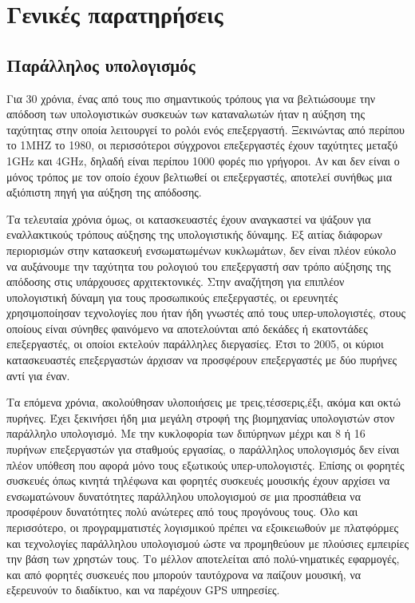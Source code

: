 \chapter{Γενικές παρατηρήσεις}

\section{Παράλληλος υπολογισμός}
Για 30 χρόνια, ένας από τους πιο σημαντικούς τρόπους για να βελτιώσουμε την απόδοση των υπολογιστικών συσκευών των καταναλωτών ήταν η αύξηση της ταχύτητας στην οποία λειτουργεί το ρολόι ενός επεξεργαστή. Ξεκινώντας από περίπου το 1MHZ το 1980, οι περισσότεροι σύγχρονοι επεξεργαστές έχουν ταχύτητες μεταξύ 1GHz και 4GHz, δηλαδή είναι περίπου 1000 φορές πιο γρήγοροι. Αν και δεν είναι ο μόνος τρόπος με τον οποίο έχουν βελτιωθεί οι επεξεργαστές, αποτελεί συνήθως μια αξιόπιστη πηγή για αύξηση της απόδοσης.

Τα τελευταία χρόνια όμως, οι κατασκευαστές έχουν αναγκαστεί να ψάξουν για εναλλακτικούς τρόπους αύξησης της υπολογιστικής δύναμης. Εξ αιτίας διάφορων περιορισμών στην κατασκευή ενσωματωμένων κυκλωμάτων, δεν είναι πλέον εύκολο να αυξάνουμε την ταχύτητα του ρολογιού του επεξεργαστή σαν τρόπο αύξησης της απόδοσης στις υπάρχουσες αρχιτεκτονικές. Στην αναζήτηση για επιπλέον υπολογιστική δύναμη για τους προσωπικούς επεξεργαστές, οι ερευνητές χρησιμοποίησαν τεχνολογίες που ήταν ήδη γνωστές από τους υπερ-υπολογιστές, στους οποίους είναι σύνηθες φαινόμενο να αποτελούνται από δεκάδες ή εκατοντάδες επεξεργαστές, οι οποίοι εκτελούν παράλληλες διεργασίες. Έτσι το 2005, οι κύριοι κατασκευαστές επεξεργαστών άρχισαν να προσφέρουν επεξεργαστές με δύο πυρήνες αντί για έναν. 

Τα επόμενα χρόνια, ακολούθησαν υλοποιήσεις με τρεις,τέσσερις,έξι, ακόμα και οκτώ πυρήνες. Έχει ξεκινήσει ήδη μια μεγάλη στροφή της βιομηχανίας υπολογιστών στον παράλληλο υπολογισμό. Με την κυκλοφορία των διπύρηνων μέχρι και 8 ή 16 πυρήνων επεξεργαστών για σταθμούς εργασίας, ο παράλληλος υπολογισμός δεν είναι πλέον υπόθεση που αφορά μόνο τους εξωτικούς υπερ-υπολογιστές. Επίσης οι φορητές συσκευές όπως κινητά τηλέφωνα και φορητές συσκευές μουσικής έχουν αρχίσει να ενσωματώνουν δυνατότητες παράλληλου υπολογισμού σε μια προσπάθεια να προσφέρουν δυνατότητες πολύ ανώτερες από τους προγόνους τους. Όλο και περισσότερο, οι προγραμματιστές λογισμικού πρέπει να εξοικειωθούν με πλατφόρμες και τεχνολογίες παράλληλου υπολογισμού ώστε να προμηθεύουν με πλούσιες εμπειρίες την βάση των χρηστών τους. Το μέλλον αποτελείται από πολύ-νηματικές εφαρμογές, και από φορητές συσκευές που μπορούν ταυτόχρονα να παίζουν μουσική, να εξερευνούν το διαδίκτυο, και να παρέχουν GPS υπηρεσίες.\cite{gpgpu-3}
